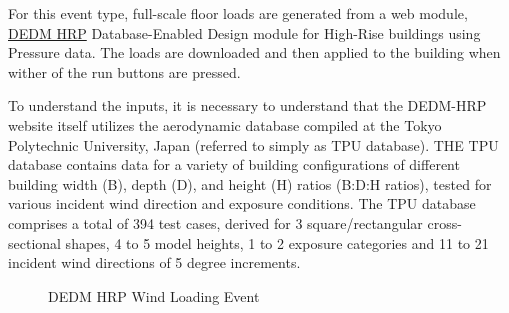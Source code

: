 For this event type, full-scale floor loads are generated from a web module, 
\href{http://evovw.ce.nd.edu/DEDM_HRP/DEDMP_INT_v3_4evo.html}{DEDM HRP} Database-Enabled Design module 
for High-Rise buildings using Pressure data. The loads  are downloaded and then applied to the 
building when wither of the run buttons are pressed.

To understand the inputs, it is necessary to understand that the DEDM-HRP website itself 
utilizes the aerodynamic database compiled at the Tokyo Polytechnic 
University, Japan (referred to simply as TPU database). THE TPU database contains data 
for a variety of building  configurations of different building width (B), depth (D), and 
height (H) ratios (B:D:H ratios), tested for various incident wind direction and exposure conditions.
 The TPU database comprises a total of 394 test cases, derived for 3 square/rectangular cross-sectional 
shapes, 4 to 5 model heights, 1 to 2 exposure categories and 11 to 21 incident wind directions of 5 
degree increments. 

\begin{figure}[!htbp]
  \caption{DEDM HRP Wind Loading Event}
  \label{fig:dedm_hrp}
\end{figure}

